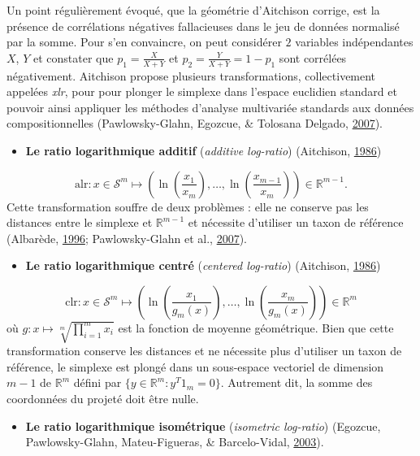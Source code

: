\documentclass[12pt,a4paper]{reedthesis}
\providecommand{\tightlist}{%
  \setlength{\itemsep}{0pt}\setlength{\parskip}{0pt}}
\newcommand \RR {\mathbb{R}}
\theoremstyle{definition}
\theoremstyle{definition}
\theoremstyle{definition}
\theoremstyle{remark}
\begin{document}
Un point régulièrement évoqué, que la géométrie d'Aitchison corrige, est la présence de corrélations négatives fallacieuses dans le jeu de données normalisé par la somme. Pour s'en convaincre, on peut considérer \(2\) variables indépendantes \(X\), \(Y\) et constater que \(p_1 = \frac{X}{X+Y}\) et \(p_2 = \frac{Y}{X+Y} = 1 - p_1\) sont corrélées négativement. Aitchison propose plusieurs transformations, collectivement appelées \emph{xlr}, pour pour plonger le simplexe dans l'espace euclidien standard et pouvoir ainsi appliquer les méthodes d'analyse multivariée standards aux données compositionnelles (Pawlowsky-Glahn, Egozcue, \& Tolosana Delgado, \protect\hyperlink{ref-pawlowsky2007lecture}{2007}).
\begin{itemize}
\tightlist
\item
  \textbf{Le ratio logarithmique additif} (\emph{additive log-ratio}) (Aitchison, \protect\hyperlink{ref-aitchison1986statistical}{1986})
\end{itemize}
\begin{equation*}
\text{alr}: x \in \mathcal{S}^m \mapsto \left(\ln\left(\frac{x_1}{x_m}\right), \ldots, \ln\left(\frac{x_{m-1}}{x_m}\right) \right) \in \RR^{m-1}.
\end{equation*}
Cette transformation souffre de deux problèmes : elle ne conserve pas les distances entre le simplexe et \(\RR^{m-1}\) et nécessite d'utiliser un taxon de référence (Albarède, \protect\hyperlink{ref-albarede1996introduction}{1996}; Pawlowsky-Glahn et al., \protect\hyperlink{ref-pawlowsky2007lecture}{2007}).
\begin{itemize}
\tightlist
\item
  \textbf{Le ratio logarithmique centré} (\emph{centered log-ratio}) (Aitchison, \protect\hyperlink{ref-aitchison1986statistical}{1986})
\end{itemize}
\begin{equation*}
\text{clr}: x \in \mathcal{S}^m \mapsto \left(\ln\left(\frac{x_1}{g_m(x)}\right), \ldots, \ln\left(\frac{x_{m}}{g_m(x)}\right) \right) \in \RR^{m}
\end{equation*}
où \(g:x\mapsto \sqrt[m]{\prod_{i=1}^m x_i}\) est la fonction de moyenne géométrique.
Bien que cette transformation conserve les distances et ne nécessite plus d'utiliser un taxon de référence, le simplexe est plongé dans un sous-espace vectoriel de dimension \(m-1\) de \(\RR^m\) défini par \(\{y \in \RR^m: y^T 1_m = 0\}\). Autrement dit, la somme des coordonnées du projeté doit être nulle.
\begin{itemize}
\tightlist
\item
  \textbf{Le ratio logarithmique isométrique} (\emph{isometric log-ratio}) (Egozcue, Pawlowsky-Glahn, Mateu-Figueras, \& Barcelo-Vidal, \protect\hyperlink{ref-egozcue2003isometric}{2003}).
\end{itemize}
\end{document}
